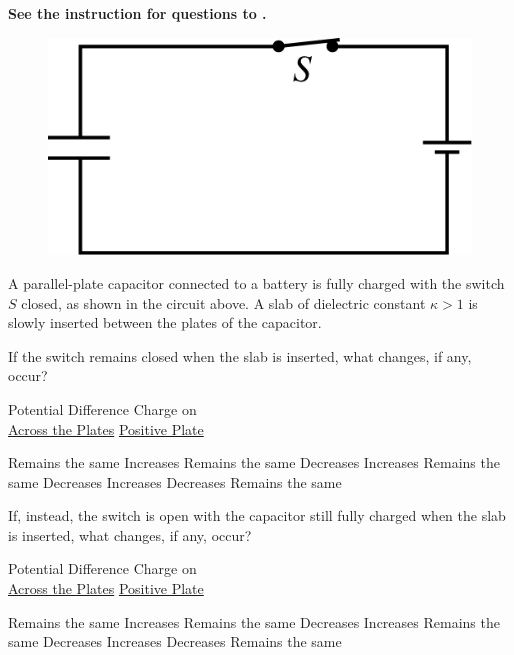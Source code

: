 \textbf{See the instruction for questions  to .}

\begin{figure}[H]
    \centering
    \includegraphics[scale=0.3]{images/img-007-011.png}
\end{figure}

A parallel-plate capacitor connected to a battery is fully charged with the switch $S$ closed, as shown in the circuit above. A slab of dielectric constant $\kappa>1$ is slowly inserted between the plates of the capacitor.

\begin{questions}\setcounter{question}{10}\question
If the switch remains closed when the slab is inserted, what changes, if any, occur?

\tabto{0.75cm} Potential Difference
\tabto{5.00cm} Charge on \\
\tabto{0.75cm} \underline{Across the Plates}
\tabto{5.00cm} \underline{Positive Plate}

\begin{choices}
\choice Remains the same \tabto{4.25cm} Increases
\choice Remains the same \tabto{4.25cm} Decreases
\choice Increases        \tabto{4.25cm} Remains the same
\choice Decreases        \tabto{4.25cm} Increases
\choice Decreases        \tabto{4.25cm} Remains the same
\end{choices}\end{questions}

\begin{questions}\setcounter{question}{11}\question
If, instead, the switch is open with the capacitor still fully charged when the slab is inserted, what changes, if any, occur?

\tabto{0.75cm} Potential Difference
\tabto{5.00cm} Charge on \\
\tabto{0.75cm} \underline{Across the Plates}
\tabto{5.00cm} \underline{Positive Plate}

\begin{choices}
\choice Remains the same \tabto{4.25cm} Increases
\choice Remains the same \tabto{4.25cm} Decreases
\choice Increases        \tabto{4.25cm} Remains the same
\choice Decreases        \tabto{4.25cm} Increases
\choice Decreases        \tabto{4.25cm} Remains the same
\end{choices}\end{questions}
